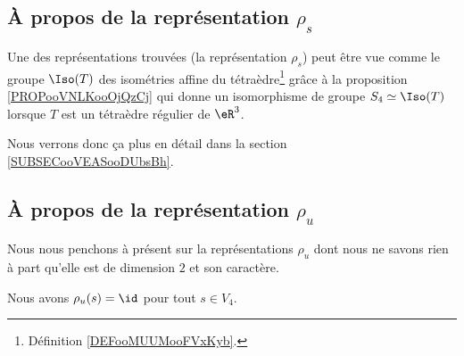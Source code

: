 
\subsection{À propos de la représentation \( \rho_s\)}

Une des représentations trouvées (la représentation \( \rho_s\)) peut être vue comme le groupe \( \Iso(T)\) des isométries affine du tétraèdre\footnote{Définition \ref{DEFooMUUMooFVxKyb}.} grâce à la proposition \ref{PROPooVNLKooOjQzCj} qui donne un isomorphisme de groupe \( S_4\simeq \Iso(T)\) lorsque \( T\) est un tétraèdre régulier de \( \eR^3\).

Nous verrons donc ça plus en détail dans la section \ref{SUBSECooVEASooDUbsBh}.

\subsection{À propos de la représentation \( \rho_u\)}

Nous nous penchons à présent sur la représentations \( \rho_u\) dont nous ne savons rien à part qu'elle est de dimension \( 2\) et son caractère.

\begin{lemma}
	Nous avons \( \rho_u(s)=\id\) pour tout \( s\in V_4\).
\end{lemma}

